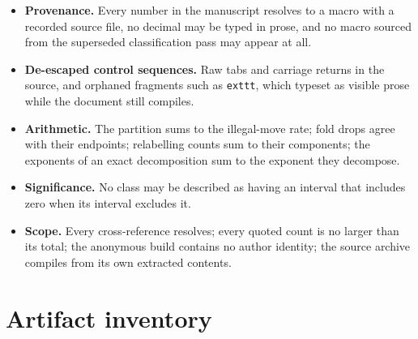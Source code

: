 \documentclass[11pt]{article}
\begin{document}
\begin{itemize}
\item \textbf{Provenance.} Every number in the manuscript resolves to a macro with a recorded source file, no decimal may be typed in prose, and no macro sourced from the superseded classification pass may appear at all.
\item \textbf{De-escaped control sequences.} Raw tabs and carriage returns in the source, and orphaned fragments such as \texttt{exttt}, which typeset as visible prose while the document still compiles.
\item \textbf{Arithmetic.} The partition sums to the illegal-move rate; fold drops agree with their endpoints; relabelling counts sum to their components; the exponents of an exact decomposition sum to the exponent they decompose.
\item \textbf{Significance.} No class may be described as having an interval that includes zero when its interval excludes it.
\item \textbf{Scope.} Every cross-reference resolves; every quoted count is no larger than its total; the anonymous build contains no author identity; the source archive compiles from its own extracted contents.
\end{itemize}

\section{Artifact inventory}
\end{document}
